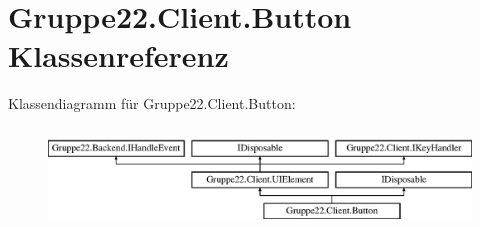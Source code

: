 \hypertarget{class_gruppe22_1_1_client_1_1_button}{\section{Gruppe22.\-Client.\-Button Klassenreferenz}
\label{class_gruppe22_1_1_client_1_1_button}
}
Klassendiagramm für Gruppe22.\-Client.\-Button\-:\begin{figure}[H]
\begin{center}
\leavevmode
\includegraphics[height=2.692308cm]{class_gruppe22_1_1_client_1_1_button}
\end{center}
\end{figure}
